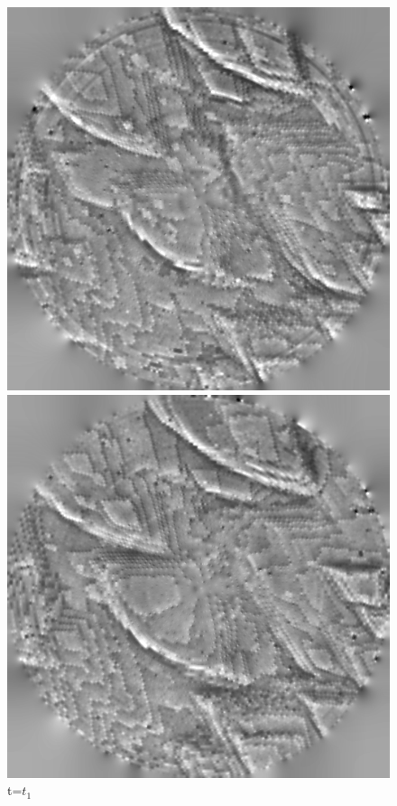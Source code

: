 \begin{figure}[!ht]
\centering


    \includegraphics[width=\linewidth]{images/006_X10s50l10m_MOv2_17.png}
    \caption*{t=$t_1$} 
\endminipage\hfill
{}
    \includegraphics[width=\linewidth]{images/006_X10s50l10m_MOv2_122.png}

\end{figure}
